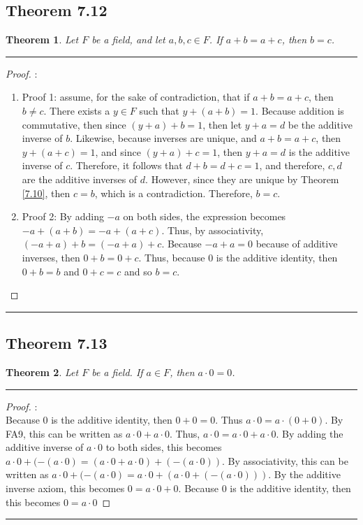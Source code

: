 \documentclass[openany, amssymb, psamsfonts]{amsart}
\newtheorem{thm}{Theorem}[section]
\theoremstyle{definition}
\numberwithin{equation}{section}
\begin{document}
\subsection*{Theorem 7.12}
\begin{thm}
\label{7.12}
	Let $F$ be a field, and let $a,b,c\in F$. If $a + b = a + c$, then $b = c$.
\end{thm}
\vspace{4pt}     \hrule   \vspace{4pt}
\begin{proof}:\\
    \begin{enumerate}
        \item Proof 1: assume, for the sake of contradiction, that if $a+ b = a+ c$, then $b\neq c$. There exists a $y\in F$ such that $y + (a + b) = 1$. Because addition is commutative, then since $(y + a) + b =1$, then let $y+ a = d$ be the additive inverse of $b$. Likewise, because inverses are unique, and $a + b = a+ c$, then $y + (a+ c) = 1$, and since $(y+ a) + c =1$, then $y+ a = d$ is the additive inverse of $c$. Therefore, it follows that $d + b= d + c =1$, and therefore, $c,d$ are the additive inverses of $d$. However, since they are unique by Theorem \ref{7.10}, then $c=b$, which is a contradiction. Therefore, $b=c$.
        \item Proof 2: By adding $-a$ on both sides, the expression becomes $-a+(a+b) = -a+(a+c)$. Thus, by associativity, $(-a+a)+b = (-a+a)+c$. Because $-a+a = 0$ because of additive inverses, then $0+b = 0+c$. Thus, because $0$ is the additive identity, then $0+b = b$ and $0+c = c$ and so $b=c$.
    \end{enumerate}
    
\end{proof}		
\vspace{4pt}     \hrule   \vspace{4pt}

\subsection*{Theorem 7.13}
\begin{thm}
\label{7.13}
	Let $F$ be a field. If $a\in F$, then $a \cdot 0 = 0$. 
 \end{thm}
\vspace{4pt}     \hrule   \vspace{4pt}
\begin{proof}:\\
Because $0$ is the additive identity, then $0+0 = 0$. Thus $a\cdot 0 = a\cdot (0+0)$. By FA9, this can be written as $a\cdot 0 + a\cdot 0$. Thus, $a\cdot 0 = a\cdot 0 + a\cdot 0$. By adding the additive inverse of $a\cdot 0$ to both sides, this becomes $a\cdot 0 + (-(a\cdot 0) = (a\cdot 0+a\cdot 0)+ (-(a\cdot 0))$. By associativity, this can be written as $a\cdot 0 + (-(a\cdot 0) = a\cdot 0+(a\cdot 0+ (-(a\cdot 0)))$. By the additive inverse axiom, this becomes $0 = a\cdot 0 + 0$. Because $0$ is the additive identity, then this becomes $0= a\cdot 0$
\end{proof}		
\vspace{4pt}     \hrule   \vspace{4pt}
\end{document}
